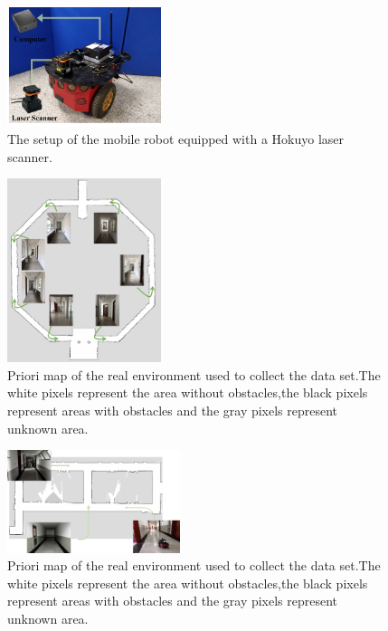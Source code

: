 \documentclass[journal]{IEEEtran}
\begin{document}
\begin{figure}[H]
	\centering
	\includegraphics[width=0.4\textwidth]{robot.png}
	\caption{The setup of the mobile robot equipped with a Hokuyo laser scanner.} 
	\label{fig:robot}
\end{figure}

\begin{figure}[H]
	\centering
	\includegraphics[width=0.4\textwidth]{map1.png}
	\caption{Priori map \uppercase\expandafter{} of the real environment used to collect the data set.The white pixels represent the area without obstacles,the black pixels represent areas with obstacles and the gray pixels represent unknown area.} 
	\label{fig:map1}
\end{figure}

\begin{figure}[H]
	\centering
	\includegraphics[width=0.45\textwidth]{map2.png}
	\caption{Priori map \uppercase\expandafter{} of the real environment used to collect the data set.The white pixels represent the area without obstacles,the black pixels represent areas with obstacles and the gray pixels represent unknown area.}
	 \label{fig:map2}
\end{figure}
\end{document}
